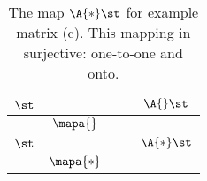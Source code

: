 \begin{table}[htdp]
\caption[The map $\A{*}\st$ for example matrix (c)]{The map $\A{*}\st$ for example matrix (c). This mapping in surjective: one-to-one and onto.}
\begin{center}
\begin{tabular}{ccc}
%
  $\st$ && $\qquad \A{} \st$ \\\hline
%
  \raisebox{-0.5\height}{\includegraphics[ width = 2.000in ] {images/ftola/"map unit circle"}} 
    \qquad & $\mapa{}$ & 
  \raisebox{-0.5\height}{\includegraphics[ width = 2.000in ] {images/ftola/"map a222 A"}} \\[100pt]
  $\st$ && $\qquad\A{*} \st$ \\\hline
%
  \raisebox{-0.5\height}{\includegraphics[ width = 2.000in ] {images/ftola/"map unit circle"}} 
    \qquad & $\mapa{*}$ &
  \raisebox{-0.5\height}{\includegraphics[ width = 2.000in ] {images/ftola/"map a222 As"}}
%
\end{tabular}
\end{center}
\label{tab:ftola:maps:(c)}
\end{table}%


\endinput